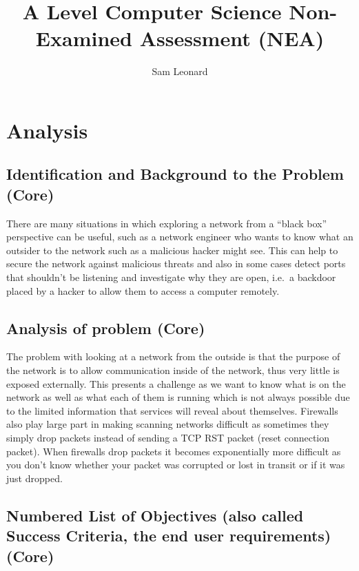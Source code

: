 \documentclass[titlepage]{article}
\author{Sam Leonard}
\title{A Level Computer Science Non-Examined Assessment (NEA)}
\date{}
\begin{document}
\maketitle

\tableofcontents

\section{Analysis}

\subsection{Identification and Background to the Problem (Core)}

There are many situations in which exploring a network from a ``black box'' perspective
can be useful, such as a network engineer who wants to know what an outsider to the network
such as a malicious hacker might see.
This can help to secure the network against malicious threats and also in some cases detect
ports that shouldn't be listening and investigate why they are open, i.e.\ a backdoor placed
by a hacker to allow them to access a computer remotely.

\subsection{Analysis of problem (Core)}

The problem with looking at a network from the outside is that the purpose of the network is to
allow communication inside of the network, thus very little is exposed externally. This presents
a challenge as we want to know what is on the network as well as what each of them is running which
is not always possible due to the limited information that services will reveal about themselves.
Firewalls also play large part in making scanning networks difficult as sometimes they simply drop
packets instead of sending a TCP RST packet (reset connection packet). When firewalls drop packets
it becomes exponentially more difficult as you don't know whether your packet was corrupted or lost
in transit or if it was just dropped.

\subsection{Numbered List of Objectives (also called Success Criteria, the end user requirements) (Core)}
\end{document}
